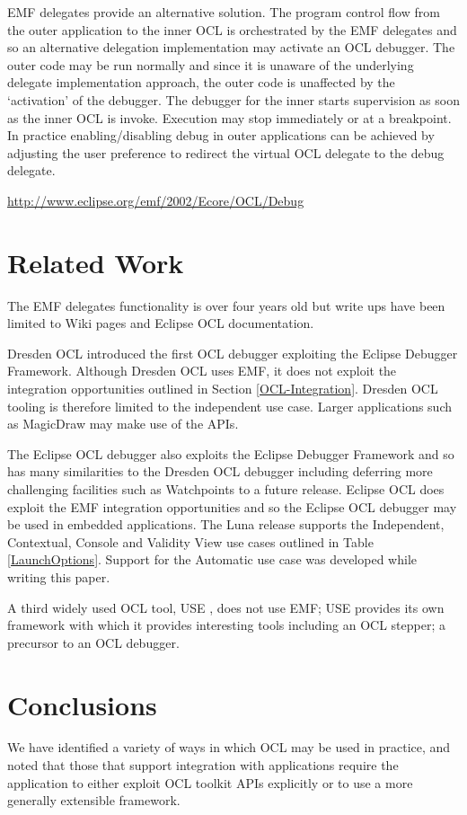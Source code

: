 \documentclass[a4paper]{article}
\begin{document}
EMF delegates provide an alternative solution. The program control flow from the outer application to the inner OCL is orchestrated by the EMF delegates and so an alternative delegation implementation may activate an OCL debugger. The outer code may be run normally and since it is unaware of the underlying delegate implementation approach, the outer code is unaffected by the `activation' of the debugger. The debugger for the inner starts supervision as soon as the inner OCL is invoke. Execution may stop immediately or at a breakpoint. In practice enabling/disabling debug in outer applications can be achieved by adjusting the user preference to redirect the virtual OCL delegate to the debug delegate.

\url{http://www.eclipse.org/emf/2002/Ecore/OCL/Debug}

\section{Related Work}\label{Related-Work}

The EMF delegates functionality is over four years old but write ups have been limited to Wiki pages\cite{OCLinEcore} and Eclipse OCL documentation.

Dresden OCL\cite{DresdenOCL-Debug} introduced the first OCL debugger exploiting the Eclipse Debugger Framework. Although Dresden OCL uses EMF, it does not exploit the integration opportunities outlined in Section \ref{OCL-Integration}. Dresden OCL tooling is therefore limited to the independent use case. Larger applications such as MagicDraw may make use of the APIs.

The Eclipse OCL debugger also exploits the Eclipse Debugger Framework and so has many similarities to the Dresden OCL debugger including deferring more challenging facilities such as Watchpoints to a future release. Eclipse OCL does exploit the EMF integration opportunities and so the Eclipse OCL debugger may be used in embedded applications. The Luna release \cite{OCL-Luna} supports the Independent, Contextual, Console and Validity View use cases outlined in Table \ref{LaunchOptions}. Support for the Automatic use case was developed while writing this paper.

A third widely used OCL tool, USE \cite{USE}, does not use EMF; USE provides its own framework with which it provides interesting tools including an OCL stepper; a precursor to an OCL debugger.

\section{Conclusions}\label{Conclusion}
We have identified a variety of ways in which OCL may be used in practice, and noted that those that support integration with applications require the application to either exploit OCL toolkit APIs explicitly or to use a more generally extensible framework.
\end{document}
